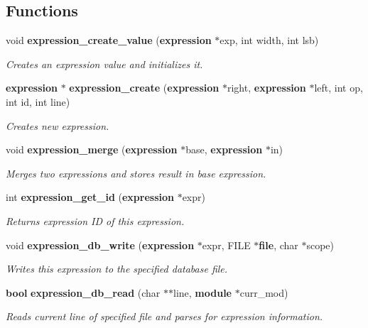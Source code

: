\subsection*{Functions}
\begin{CompactItemize}
\item 
void {\bf expression\_\-create\_\-value} ({\bf expression} $\ast$exp, int width, int lsb)
\begin{CompactList}\small\item\em Creates an expression value and initializes it.\item\end{CompactList}\item 
{\bf expression} $\ast$ {\bf expression\_\-create} ({\bf expression} $\ast$right, {\bf expression} $\ast$left, int op, int id, int line)
\begin{CompactList}\small\item\em Creates new expression.\item\end{CompactList}\item 
void {\bf expression\_\-merge} ({\bf expression} $\ast$base, {\bf expression} $\ast$in)
\begin{CompactList}\small\item\em Merges two expressions and stores result in base expression.\item\end{CompactList}\item 
int {\bf expression\_\-get\_\-id} ({\bf expression} $\ast$expr)
\begin{CompactList}\small\item\em Returns expression ID of this expression.\item\end{CompactList}\item 
void {\bf expression\_\-db\_\-write} ({\bf expression} $\ast$expr, FILE $\ast${\bf file}, char $\ast$scope)
\begin{CompactList}\small\item\em Writes this expression to the specified database file.\item\end{CompactList}\item 
{\bf bool} {\bf expression\_\-db\_\-read} (char $\ast$$\ast$line, {\bf module} $\ast$curr\_\-mod)
\begin{CompactList}\small\item\em Reads current line of specified file and parses for expression information.\item\end{CompactList}\item 
$$
\end{CompactItemize}
